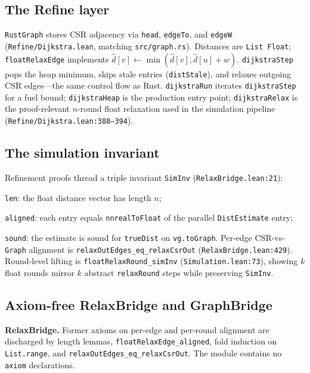 \documentclass[11pt,a4paper]{article}
\makeatletter
\let\enitfb@enumerate\enumerate
\let\enitfb@endenumerate\endenumerate
\renewenvironment{enumerate}[1][]{\enitfb@enumerate}{\enitfb@endenumerate}%
\newcommand{\dhat}{\hat{d}}
\newcommand{\code}[1]{\texttt{#1}}
\theoremstyle{plain}
\theoremstyle{definition}
\makeatother
\begin{document}
\subsection{The Refine layer}\label{sec:refine-dijkstra}

\code{RustGraph} stores CSR adjacency via \code{head}, \code{edgeTo}, and
\code{edgeW} (\code{Refine/Dijkstra.lean}, matching \code{src/graph.rs}).
Distances are \code{List Float}; \code{floatRelaxEdge} implements
$\dhat[v] \leftarrow \min(\dhat[v], \dhat[u]+w)$.
\code{dijkstraStep} pops the heap minimum, skips stale entries
(\code{distStale}), and relaxes outgoing CSR edges---the same control flow
as Rust.
\code{dijkstraRun} iterates \code{dijkstraStep} for a fuel bound;
\code{dijkstraHeap} is the production entry point;
\code{dijkstraRelax} is the proof-relevant $n$-round float relaxation used
in the simulation pipeline (\code{Refine/Dijkstra.lean:388--394}).

\subsection{The simulation invariant}\label{sec:refine-sim}

Refinement proofs thread a triple invariant \code{SimInv}
(\code{RelaxBridge.lean:21}):
\begin{enumerate}[leftmargin=1.6em,itemsep=0.2em]
\item \code{len}: the float distance vector has length $n$;
\item \code{aligned}: each entry equals \code{nnrealToFloat} of the parallel
      \code{DistEstimate} entry;
\item \code{sound}: the estimate is sound for \code{trueDist} on
      \code{vg.toGraph}.
\end{enumerate}
Per-edge CSR-vs-\code{Graph} alignment is
\code{relaxOutEdges\_eq\_relaxCsrOut} (\code{RelaxBridge.lean:429}).
Round-level lifting is \code{floatRelaxRound\_simInv}
(\code{Simulation.lean:73}), showing $k$ float rounds mirror $k$ abstract
\code{relaxRound} steps while preserving \code{SimInv}.

\subsection{Axiom-free RelaxBridge and GraphBridge}\label{sec:refine-proved}

\textbf{RelaxBridge.} Former axioms on per-edge and per-round alignment are
discharged by length lemmas, \code{floatRelaxEdge\_aligned}, fold induction
on \code{List.range}, and \code{relaxOutEdges\_eq\_relaxCsrOut}. The module
contains no \code{axiom} declarations.
\end{document}
